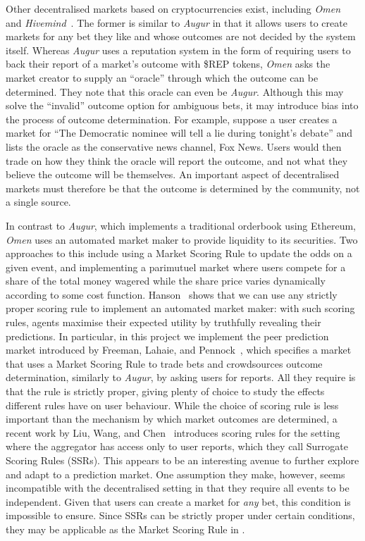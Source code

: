 Other decentralised markets based on cryptocurrencies exist, including
\emph{Omen}~\cite{Omen} and \emph{Hivemind}~\cite{Hivemind}. The former is
similar to \emph{Augur} in that it allows users to create markets for any bet
they like and whose outcomes are not decided by the system itself. Whereas
\emph{Augur} uses a reputation system in the form of requiring users to back
their report of a market's outcome with \$REP tokens, \emph{Omen} asks the
market creator to supply an ``oracle'' through which the outcome can be
determined. They note that this oracle can even be \emph{Augur}. Although this
may solve the ``invalid'' outcome option for ambiguous bets, it may introduce
bias into the process of outcome determination. For example, suppose a user
creates a market for ``The Democratic nominee will tell a lie during tonight's
debate'' and lists the oracle as the conservative news channel, Fox News. Users
would then trade on how they think the oracle will report the outcome, and not
what they believe the outcome will be themselves. An important aspect of
decentralised markets must therefore be that the outcome is determined by the
community, not a single source. 

In contrast to \emph{Augur}, which implements a traditional orderbook using
Ethereum, \emph{Omen} uses an automated market maker to provide liquidity to
its securities. Two approaches to this include using a Market Scoring Rule to
update the odds on a given event, and implementing a parimutuel market where
users compete for a share of the total money wagered while the share price
varies dynamically according to some cost function. Hanson~\cite{Hanson2003}
shows that we can use any strictly proper scoring rule to implement an
automated market maker: with such scoring rules, agents maximise their expected
utility by truthfully revealing their predictions. In particular, in this
project we implement the peer prediction market introduced by Freeman, Lahaie,
and Pennock~\cite{Freeman2017}, which specifies a market that uses a Market
Scoring Rule to trade bets and crowdsources outcome determination, similarly to
\emph{Augur}, by asking users for reports. All they require is that the rule is
strictly proper, giving plenty of choice to study the effects different rules
have on user behaviour. While the choice of scoring rule is less important than
the mechanism by which market outcomes are determined, a recent work by Liu,
Wang, and Chen~\cite{Liu2020} introduces scoring rules for the setting where
the aggregator has access only to user reports, which they call Surrogate
Scoring Rules (SSRs). This appears to be an interesting avenue to further
explore and adapt to a prediction market. One assumption they make, however,
seems incompatible with the decentralised setting in that they require all
events to be independent.  Given that users can create a market for \emph{any}
bet, this condition is impossible to ensure. Since SSRs can be strictly proper
under certain conditions, they may be applicable as the Market Scoring Rule in
\cite{Freeman2017}. 

